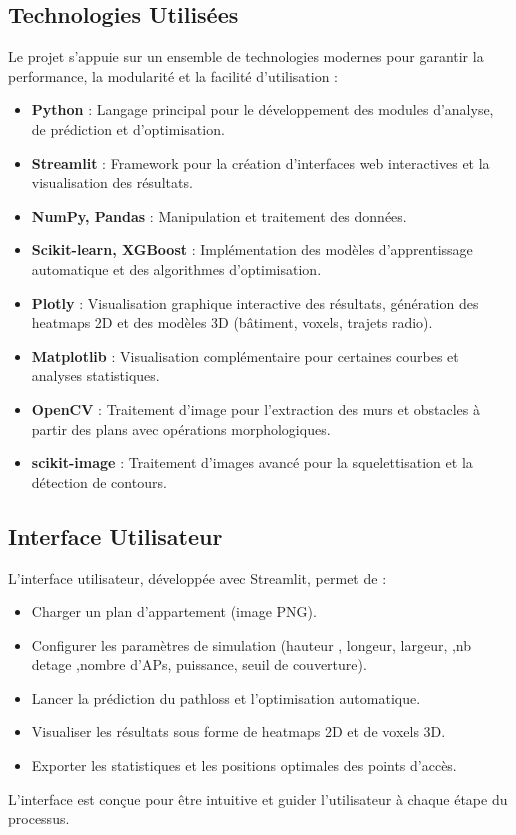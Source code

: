 \documentclass[12pt,a4paper]{article}
\begin{document}
\subsection{Technologies Utilisées}
Le projet s’appuie sur un ensemble de technologies modernes pour garantir la performance, la modularité et la facilité d’utilisation :
\begin{itemize}
    \item \textbf{Python} : Langage principal pour le développement des modules d’analyse, de prédiction et d’optimisation.
    \item \textbf{Streamlit} : Framework pour la création d’interfaces web interactives et la visualisation des résultats.
    \item \textbf{NumPy, Pandas} : Manipulation et traitement des données.
    \item \textbf{Scikit-learn, XGBoost} : Implémentation des modèles d’apprentissage automatique et des algorithmes d’optimisation.
    \item \textbf{Plotly} : Visualisation graphique interactive des résultats, génération des heatmaps 2D et des modèles 3D (bâtiment, voxels, trajets radio).
    \item \textbf{Matplotlib} : Visualisation complémentaire pour certaines courbes et analyses statistiques.
    \item \textbf{OpenCV} : Traitement d'image pour l'extraction des murs et obstacles à partir des plans avec opérations morphologiques.
    \item \textbf{scikit-image} : Traitement d'images avancé pour la squelettisation et la détection de contours.
\end{itemize}

\subsection{Interface Utilisateur}
L’interface utilisateur, développée avec Streamlit, permet de :
\begin{itemize}
    \item Charger un plan d’appartement (image PNG).
    \item Configurer les paramètres de simulation (hauteur , longeur, largeur, ,nb detage ,nombre d’APs, puissance, seuil de couverture).
    \item Lancer la prédiction du pathloss et l’optimisation automatique.
    \item Visualiser les résultats sous forme de heatmaps 2D et de voxels 3D.
    \item Exporter les statistiques et les positions optimales des points d’accès.
\end{itemize}
L’interface est conçue pour être intuitive et guider l’utilisateur à chaque étape du processus.
\end{document}

